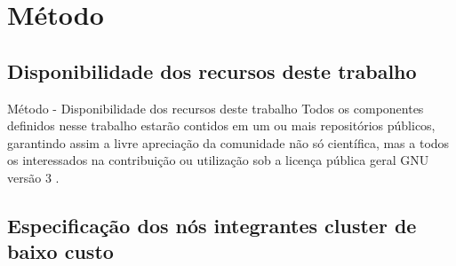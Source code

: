 \documentclass[10pt,brazil]{beamer}
\theoremstyle{definition}
\begin{document}
\section{Método}

\subsection{Disponibilidade dos recursos deste trabalho}

\begin{frame}{Método - Disponibilidade dos recursos deste trabalho}
  Todos os componentes definidos nesse trabalho estarão contidos em um ou mais repositórios públicos, garantindo assim a livre apreciação da comunidade não só científica, mas a todos os interessados na contribuição ou utilização sob a licença pública geral GNU versão 3 \cite{foss2022}.
\end{frame}

\subsection{Especificação dos nós integrantes cluster de baixo custo}
\end{document}
